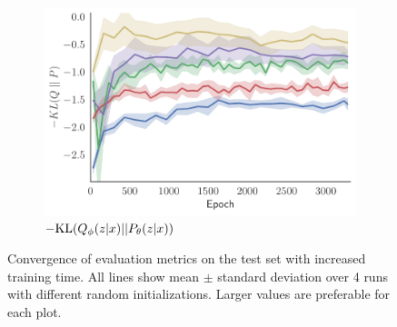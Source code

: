 \begin{figure}[t!]
\begin{subfigure}[b]{0.33\textwidth}
		\includegraphics[width=\textwidth]{figures/tighter_bounds/convergence_KL}
		\caption{$-\mathrm{KL}(Q_{\phi}(z \lvert x) || P_{\theta}(z \lvert x))$ \label{fig:mnistexpt/convergence/kl}}
	\end{subfigure}\vspace{-6pt}
	\caption{Convergence of evaluation metrics on the test set with increased training time. 
		All lines show mean $\pm$ standard deviation 
		over 4 runs with different random
		initializations. Larger values are preferable for each plot.
		\vspace{-8pt}  \label{fig:mnistexpt/convergence}}
\end{figure}

